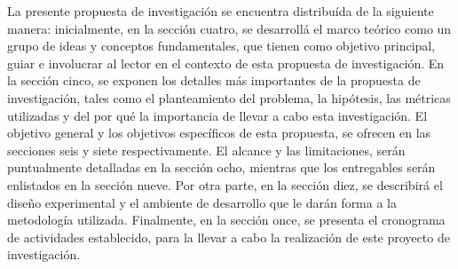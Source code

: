 La presente propuesta de investigaci\'on se encuentra distribu\'ida de la siguiente manera: inicialmente, en la secci\'on cuatro, se desarroll\'a el marco te\'orico como un grupo de ideas y conceptos fundamentales, que tienen como objetivo principal, guiar e involucrar al lector en el contexto de esta propuesta de investigaci\'on. En la secci\'on cinco, se exponen los detalles m\'as importantes de la propuesta de investigaci\'on, tales como el planteamiento del problema, la hip\'otesis, las m\'etricas utilizadas y del por qu\'e la importancia de llevar a cabo esta investigaci\'on. El objetivo general y los objetivos espec\'ificos de esta propuesta, se ofrecen en las secciones seis y siete respectivamente. El alcance y las limitaciones, ser\'an puntualmente detalladas en la secci\'on ocho, mientras que los entregables ser\'an enlistados en la secci\'on nueve. Por otra parte, en la secci\'on diez, se describir\'a el dise\~no experimental y el ambiente de desarrollo que le dar\'an forma a la metodolog\'ia utilizada. Finalmente, en la secci\'on once, se presenta el cronograma de actividades establecido, para la llevar a cabo la realizaci\'on de este proyecto de investigaci\'on.